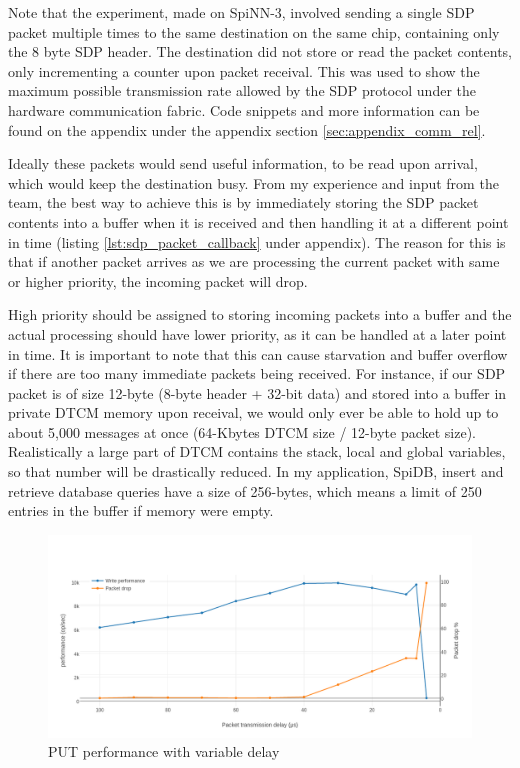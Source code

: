 Note that the experiment, made on SpiNN-3, involved sending a single SDP packet multiple times to the same destination on the same chip, containing only the 8 byte SDP header. The destination did not store or read the packet contents, only incrementing a counter upon packet receival. This was used to show the maximum possible transmission rate allowed by the SDP protocol under the hardware communication fabric. Code snippets and more information can be found on the appendix under the appendix section \ref{sec:appendix_comm_rel}.

Ideally these packets would send useful information, to be read upon arrival, which would keep the destination busy. From my experience and input from the team, the best way to achieve this is by immediately storing the SDP packet contents into a buffer when it is received and then handling it at a different point in time (listing \ref{lst:sdp_packet_callback} under appendix). The reason for this is that if another packet arrives as we are processing the current packet with same or higher priority, the incoming packet will drop.

High priority should be assigned to storing incoming packets into a buffer and the actual processing should have lower priority, as it can be handled at a later point in time. It is important to note that this can cause starvation and buffer overflow if there are too many immediate packets being received. For instance, if our SDP packet is of size 12-byte (8-byte header + 32-bit data) and stored into a buffer in private DTCM memory upon receival, we would only ever be able to hold up to about 5,000 messages at once (64-Kbytes DTCM size / 12-byte packet size). Realistically a large part of DTCM contains the stack, local and global variables, so that number will be drastically reduced. In my application, SpiDB, insert and retrieve database queries have a size of 256-bytes, which means a limit of 250 entries in the buffer if memory were empty.

\begin{figure}
\begin{center}
	\includegraphics[width=1.3\textwidth, natwidth=1063, natheight=509]{images/transmission_delay.png}
\end{center}
\caption{PUT performance with variable delay}
\label{fig:transmission-delay}
\end{figure}
	
